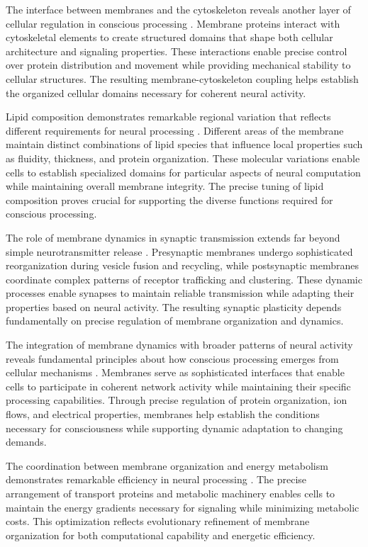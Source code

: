 The interface between membranes and the cytoskeleton reveals another layer of cellular regulation in conscious processing \cite{Zimmerberg2006}. Membrane proteins interact with cytoskeletal elements to create structured domains that shape both cellular architecture and signaling properties. These interactions enable precise control over protein distribution and movement while providing mechanical stability to cellular structures. The resulting membrane-cytoskeleton coupling helps establish the organized cellular domains necessary for coherent neural activity.

Lipid composition demonstrates remarkable regional variation that reflects different requirements for neural processing \cite{Yang2019}. Different areas of the membrane maintain distinct combinations of lipid species that influence local properties such as fluidity, thickness, and protein organization. These molecular variations enable cells to establish specialized domains for particular aspects of neural computation while maintaining overall membrane integrity. The precise tuning of lipid composition proves crucial for supporting the diverse functions required for conscious processing.

The role of membrane dynamics in synaptic transmission extends far beyond simple neurotransmitter release \cite{Sudhof2013}. Presynaptic membranes undergo sophisticated reorganization during vesicle fusion and recycling, while postsynaptic membranes coordinate complex patterns of receptor trafficking and clustering. These dynamic processes enable synapses to maintain reliable transmission while adapting their properties based on neural activity. The resulting synaptic plasticity depends fundamentally on precise regulation of membrane organization and dynamics.

The integration of membrane dynamics with broader patterns of neural activity reveals fundamental principles about how conscious processing emerges from cellular mechanisms \cite{Choquet2013}. Membranes serve as sophisticated interfaces that enable cells to participate in coherent network activity while maintaining their specific processing capabilities. Through precise regulation of protein organization, ion flows, and electrical properties, membranes help establish the conditions necessary for consciousness while supporting dynamic adaptation to changing demands.

The coordination between membrane organization and energy metabolism demonstrates remarkable efficiency in neural processing \cite{Goni2014}. The precise arrangement of transport proteins and metabolic machinery enables cells to maintain the energy gradients necessary for signaling while minimizing metabolic costs. This optimization reflects evolutionary refinement of membrane organization for both computational capability and energetic efficiency.

